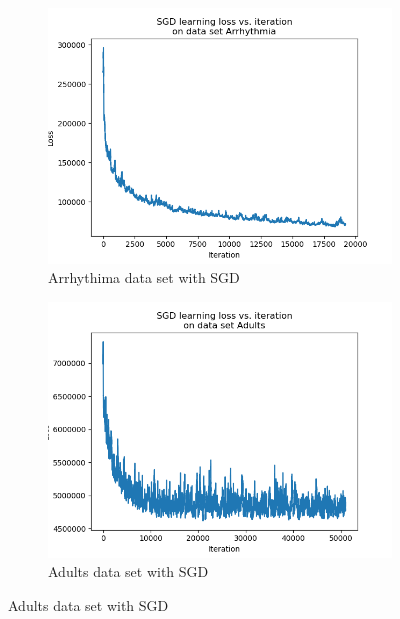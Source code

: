 \documentclass{article}
\begin{document}
\begin{figure}[H]
	\centering
	\begin{subfigure}[t]{0.45\linewidth}
		\includegraphics[width=\linewidth]{figs/loss/arrhythmia_sgd.png}
		\caption{Arrhythima data set with SGD}
	\end{subfigure}
	\begin{subfigure}[t]{0.45\linewidth}
		\includegraphics[width=\linewidth]{figs/loss/adults_sgd.png}
		\caption{Adults data set with SGD}
	\end{subfigure}


\end{figure}
\end{document}
